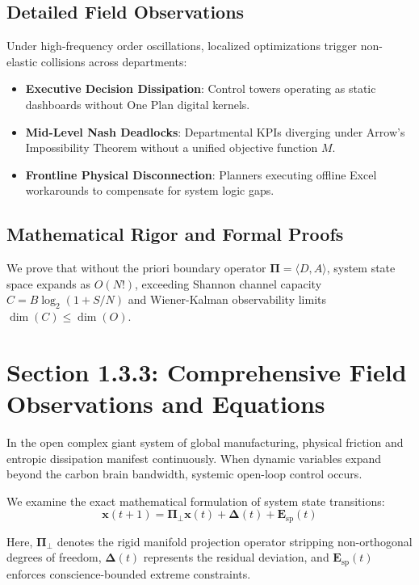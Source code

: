 \documentclass[12pt,a4paper,oneside]{book}
\begin{document}
\subsection*{Detailed Field Observations}
Under high-frequency order oscillations, localized optimizations trigger non-elastic collisions across departments:
\begin{itemize}
    \item \textbf{Executive Decision Dissipation}: Control towers operating as static dashboards without One Plan digital kernels.
    \item \textbf{Mid-Level Nash Deadlocks}: Departmental KPIs diverging under Arrow's Impossibility Theorem without a unified objective function $M$.
    \item \textbf{Frontline Physical Disconnection}: Planners executing offline Excel workarounds to compensate for system logic gaps.
\end{itemize}

\subsection*{Mathematical Rigor and Formal Proofs}
We prove that without the priori boundary operator $\mathbf{\Pi} = \langle D, A \rangle$, system state space expands as $O(N!)$, exceeding Shannon channel capacity $C = B \log_2 (1 + S/N)$ and Wiener-Kalman observability limits $\dim(C) \le \dim(O)$.
\clearpage
\section{Section 1.3.3: Comprehensive Field Observations and Equations}

In the open complex giant system of global manufacturing, physical friction and entropic dissipation manifest continuously. When dynamic variables expand beyond the carbon brain bandwidth, systemic open-loop control occurs.

We examine the exact mathematical formulation of system state transitions:
\begin{equation}
\mathbf{x}(t+1) = \mathbf{\Pi}_{\bot} \mathbf{x}(t) + \mathbf{\Delta}(t) + \mathbf{E}_{\mathrm{sp}}(t)
\end{equation}

Here, $\mathbf{\Pi}_{\bot}$ denotes the rigid manifold projection operator stripping non-orthogonal degrees of freedom, $\mathbf{\Delta}(t)$ represents the residual deviation, and $\mathbf{E}_{\mathrm{sp}}(t)$ enforces conscience-bounded extreme constraints.
\end{document}
